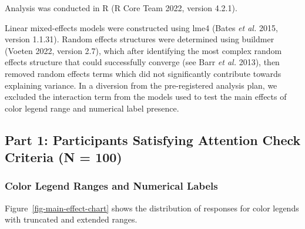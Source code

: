 \documentclass[
]{interact}
\begin{document}
Analysis was conducted in R (R Core Team 2022, version 4.2.1).

Linear mixed-effects models were constructed using lme4 (Bates \emph{et
al.} 2015, version 1.1.31). Random effects structures were determined
using buildmer (Voeten 2022, version 2.7), which after identifying the
most complex random effects structure that could successfully converge
(see Barr \emph{et al.} 2013), then removed random effects terms which
did not significantly contribute towards explaining variance. In a
diversion from the pre-registered analysis plan, we excluded the
interaction term from the models used to test the main effects of color
legend range and numerical label presence.

\hypertarget{part-1-participants-satisfying-attention-check-criteria-n-100}{%
\subsection{Part 1: Participants Satisfying Attention Check Criteria (N
=
100)}\label{part-1-participants-satisfying-attention-check-criteria-n-100}}

\hypertarget{color-legend-ranges-and-numerical-labels}{%
\subsubsection{Color Legend Ranges and Numerical
Labels}\label{color-legend-ranges-and-numerical-labels}}

Figure~\ref{fig-main-effect-chart} shows the distribution of responses
for color legends with truncated and extended ranges.
\end{document}
